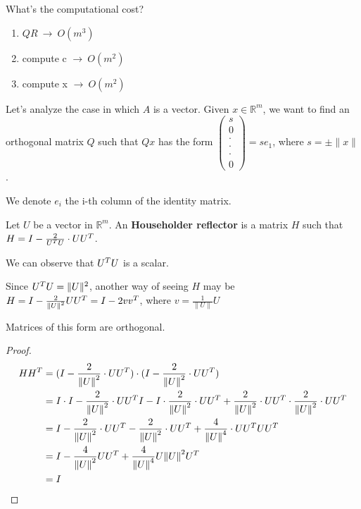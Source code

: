 \documentclass[computational_mathematics.tex]{subfiles}
\begin{document}
What's the computational cost?
\begin{enumerate}
  \item $QR ~ \rightarrow ~ O({m}^{3})$
  \item compute c $\rightarrow ~ O({m}^{2})$
  \item compute x $ \rightarrow ~ O({m}^{2})$
\end{enumerate}

Let's analyze the case in which $A$ is a vector. Given $x \in \mathds{R}^m$, we want to find an orthogonal matrix $Q$ such that $Qx$ has the form $\begin{pmatrix}s\\0\\ \cdot\\ \cdot\\ \cdot\\ 0\end{pmatrix} = se_{1}$, where $s= \pm \|x\|$.
  
  We denote $e_{i}$ the i-th column of the identity matrix.

\begin{definition}
  Let $U$ be a vector in $\mathds{R}^m$. An \textbf{Householder reflector} is a matrix $H$ such that $H = I - \frac{2}{{U}^{T}U} \cdot U {U}^{T}$.
  
  We can observe that ${U}^{T}U$ is a scalar.

    Since ${U}^{T}U = \|U\|^2$, another way of seeing $H$ may be $H = I - \frac{2}{{\|U\|}^{2}} U {U}^{T} = I - 2v {v}^{T}$, where $v = \frac{1}{\|U\|}U$

  
  \end{definition}
\begin{lemma}
  Matrices of this form are orthogonal.
\end{lemma}

\begin{proof}
  \begin{equation}
    \begin{split}
      H{H}^{T} & = (I-\frac{2}{{\|U\|}^{2}} \cdot U {U}^{T}) \cdot (I-\frac{2}{{\|U\|}^{2}} \cdot U {U}^{T})\\
      & = I\cdot I - \frac{2}{{\left\lVert U\right\rVert}^2} \cdot U {U}^{T} I-I \cdot \frac{2}{{\left\lVert U\right\rVert}^2} \cdot U {U}^{T} + \frac{2}{{\left\lVert U\right\rVert}^2} \cdot U {U}^{T} \cdot \frac{2}{{\left\lVert U\right\rVert}^2} \cdot U {U}^{T}\\
      & = I - \frac{2}{{\left\lVert U\right\rVert}^2} \cdot U {U}^{T} - \frac{2}{{\left\lVert U\right\rVert}^2} \cdot U {U}^{T} + \frac{4}{{\|U\|}^{4}} \cdot U{U}^{T} U {U}^{T}\\
      & = I - \frac{4}{{\left\lVert U\right\rVert}^2} U {U}^{T} + \frac{4}{{\|U\|}^{4}} U {\|U\|}^{2} {U}^{T}\\
      & = I
    \end{split}
  \end{equation}
\end{proof}
\end{document}
